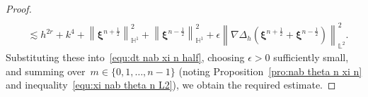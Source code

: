 \documentclass[11pt, reqno]{amsart}
\theoremstyle{definition}
\theoremstyle{remark}
\numberwithin{equation}{section}
\newcommand{\bff}{\boldsymbol}
\newcommand{\bb}{\mathbb}
\newcommand{\norm}[2]{\left\|{#1}\right\|_{#2}}
\newcommand{\inpro}[2]{\left\langle#1,#2\right\rangle}
\newcommand{\abs}[1]{\left|{#1}\right|}
\begin{document}
\begin{proof}
\begin{align*}
	\\
	&\lesssim
	h^{2r}
	+
	k^4
	+
	\norm{\bff{\xi}^{n+\frac12}}{\bb{H}^1}^2
	+
	\norm{\bff{\xi}^{n-\frac12}}{\bb{H}^1}^2
	+
	\epsilon \norm{\nabla \Delta_h\left(\bff{\xi}^{n+\frac{1}{2}}+\bff{\xi}^{n-\frac{1}{2}}\right)}{\bb{L}^2}^2.
\end{align*}
Substituting these into~\eqref{equ:dt nab xi n half}, choosing $\epsilon>0$ sufficiently small, and summing over~$m\in \{0,1,\ldots,n-1\}$ (noting Proposition~\ref{pro:nab theta n xi n} and inequality~\eqref{equ:xi nab theta n L2}), we obtain the required estimate.
\end{proof}

%
%
\end{document}

